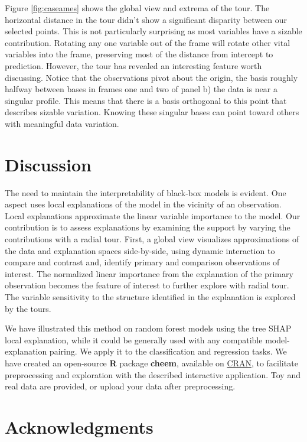 \documentclass[
  article]{article}
\begin{document}
Figure \ref{fig:caseames} shows the global view and extrema of the tour. The horizontal distance in the tour didn't show a significant disparity between our selected points. This is not particularly surprising as most variables have a sizable contribution. Rotating any one variable out of the frame will rotate other vital variables into the frame, preserving most of the distance from intercept to prediction. However, the tour has revealed an interesting feature worth discussing. Notice that the observations pivot about the origin, the basis roughly halfway between bases in frames one and two of panel b) the data is near a singular profile. This means that there is a basis orthogonal to this point that describes sizable variation. Knowing these singular bases can
point toward others with meaningful data variation.

\hypertarget{sec:discussion}{%
\section{Discussion}\label{sec:discussion}}

The need to maintain the interpretability of black-box models is evident. One aspect uses local explanations of the model in the vicinity of an observation. Local explanations approximate the linear variable importance to the model. Our contribution is to assess explanations by examining the support by varying the contributions with a radial tour. First, a global view visualizes approximations of the data and explanation spaces side-by-side, using dynamic interaction to compare and contrast and, identify primary and comparison observations of interest. The normalized linear importance from the explanation of the primary observation becomes the feature of interest to further explore with radial tour. The variable sensitivity to the structure identified in the explanation is explored by the tours.

We have illustrated this method on random forest models using the tree SHAP local explanation, while it could be generally used with any compatible model-explanation pairing. We apply it to the classification and regression tasks. We have created an open-source \textbf{R} package \textbf{cheem}, available on \href{https://CRAN.R-project.org/package=cheem}{CRAN}, to facilitate preprocessing and exploration with the described interactive application. Toy and real data are provided, or upload your data after preprocessing.

\hypertarget{acknowledgments}{%
\section{Acknowledgments}\label{acknowledgments}}
\end{document}
